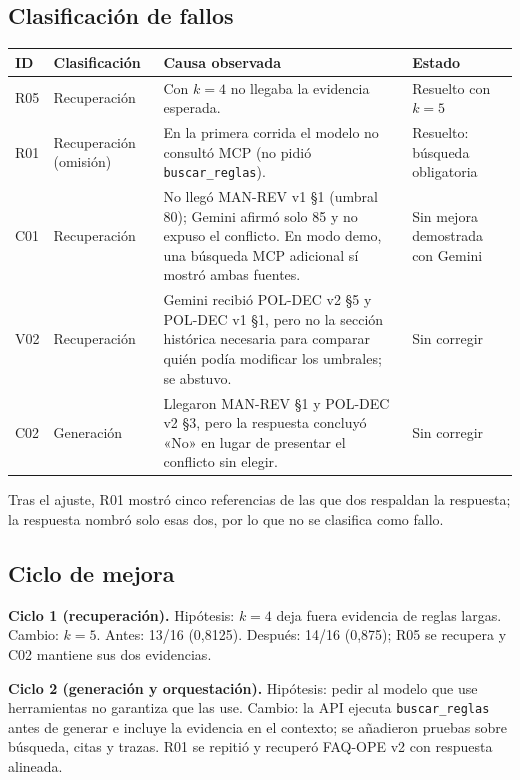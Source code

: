 \documentclass[11pt,a4paper]{article}
\newcommand{\codigo}[1]{\texttt{\small #1}}
\newcommand{\cab}{\rowcolor{azulmira!14}}
\newcommand{\tabla}{\small\rowcolors{2}{white}{grisclaro}}
\begin{document}
\subsection{Clasificación de fallos}\label{sec:fallos}
\begin{center}\tabla
\begin{tabularx}{\textwidth}{@{}p{1.1cm}p{2.5cm}Yp{2.7cm}@{}}
\toprule
\cab\textbf{ID} & \textbf{Clasificación} & \textbf{Causa observada} & \textbf{Estado}\\
\midrule
R05 & Recuperación & Con $k=4$ no llegaba la evidencia esperada. & Resuelto con $k=5$\\
R01 & Recuperación (omisión) & En la primera corrida el modelo no consultó MCP (no pidió \codigo{buscar\_\allowbreak reglas}). & Resuelto: búsqueda obligatoria\\
C01 & Recuperación & No llegó MAN-REV v1 §1 (umbral 80); Gemini afirmó solo 85 y no expuso el conflicto. En modo demo, una búsqueda MCP adicional sí mostró ambas fuentes. & Sin mejora demostrada con Gemini\\
V02 & Recuperación & Gemini recibió POL-DEC v2 §5 y POL-DEC v1 §1, pero no la sección histórica necesaria para comparar quién podía modificar los umbrales; se abstuvo. & Sin corregir\\
C02 & Generación & Llegaron MAN-REV §1 y POL-DEC v2 §3, pero la respuesta concluyó «No» en lugar de presentar el conflicto sin elegir. & Sin corregir\\
\bottomrule
\end{tabularx}
\end{center}
Tras el ajuste, R01 mostró cinco referencias de las que dos respaldan la respuesta; la respuesta nombró solo esas dos, por lo que no se clasifica como fallo.

\subsection{Ciclo de mejora}
\textbf{Ciclo 1 (recuperación).} Hipótesis: $k=4$ deja fuera evidencia de reglas largas. Cambio: $k=5$. Antes: 13/16 (0,8125). Después: 14/16 (0,875); R05 se recupera y C02 mantiene sus dos evidencias.

\textbf{Ciclo 2 (generación y orquestación).} Hipótesis: pedir al modelo que use herramientas no garantiza que las use. Cambio: la API ejecuta \codigo{buscar\_\allowbreak reglas} antes de generar e incluye la evidencia en el contexto; se añadieron pruebas sobre búsqueda, citas y trazas. R01 se repitió y recuperó FAQ-OPE v2 con respuesta alineada.
\end{document}
